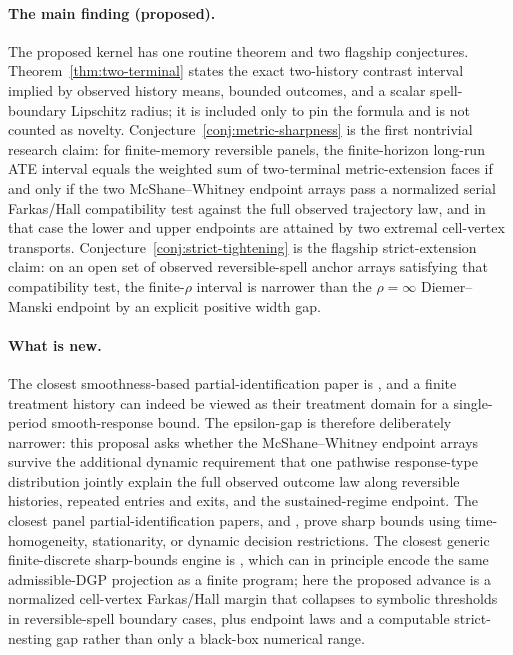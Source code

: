 \documentclass[11pt]{article}
\theoremstyle{definition}
\theoremstyle{plain}
\theoremstyle{remark}
\begin{document}
\paragraph{The main finding (proposed).}
The proposed kernel has one routine theorem and two flagship conjectures.  Theorem~\ref{thm:two-terminal} states the exact two-history contrast interval implied by observed history means, bounded outcomes, and a scalar spell-boundary Lipschitz radius; it is included only to pin the formula and is not counted as novelty.  Conjecture~\ref{conj:metric-sharpness} is the first nontrivial research claim: for finite-memory reversible panels, the finite-horizon long-run ATE interval equals the weighted sum of two-terminal metric-extension faces if and only if the two McShane--Whitney endpoint arrays pass a normalized serial Farkas/Hall compatibility test against the full observed trajectory law, and in that case the lower and upper endpoints are attained by two extremal cell-vertex transports.  Conjecture~\ref{conj:strict-tightening} is the flagship strict-extension claim: on an open set of observed reversible-spell anchor arrays satisfying that compatibility test, the finite-\(\rho\) interval is narrower than the \(\rho=\infty\) Diemer--Manski endpoint by an explicit positive width gap.

\paragraph{What is new.}
The closest smoothness-based partial-identification paper is \citet{KimKwonKwonLee2018}, and a finite treatment history can indeed be viewed as their treatment domain for a single-period smooth-response bound.  The epsilon-gap is therefore deliberately narrower: this proposal asks whether the McShane--Whitney endpoint arrays survive the additional dynamic requirement that one pathwise response-type distribution jointly explain the full observed outcome law along reversible histories, repeated entries and exits, and the sustained-regime endpoint.  The closest panel partial-identification papers, \citet{ChernozhukovFernandezValHahnNewey2013} and \citet{JunLeeShin2016}, prove sharp bounds using time-homogeneity, stationarity, or dynamic decision restrictions.  The closest generic finite-discrete sharp-bounds engine is \citet{DuarteFinkelsteinKnoxMummoloShpitser2024}, which can in principle encode the same admissible-DGP projection as a finite program; here the proposed advance is a normalized cell-vertex Farkas/Hall margin that collapses to symbolic thresholds in reversible-spell boundary cases, plus endpoint laws and a computable strict-nesting gap rather than only a black-box numerical range.
\end{document}
